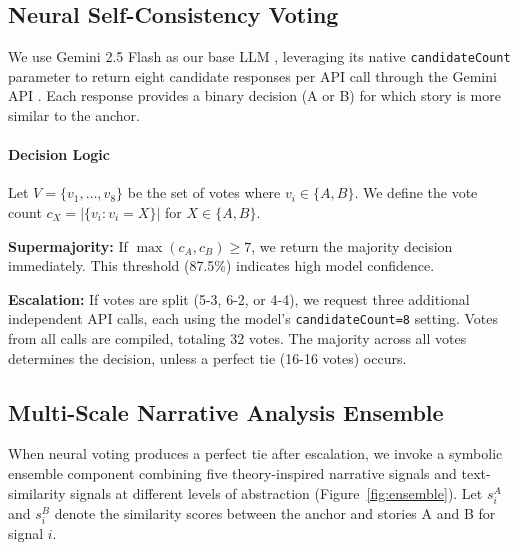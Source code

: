 \documentclass[11pt]{article}
\begin{document}
\subsection{Neural Self-Consistency Voting}

We use Gemini 2.5 Flash as our base LLM \citep{google-gemini-2-5-flash-2025}, leveraging its native \texttt{candidateCount} parameter to return eight candidate responses per API call through the Gemini API \citep{google-generative-ai-api-2025}. Each response provides a binary decision (A or B) for which story is more similar to the anchor.

\paragraph{Decision Logic}
Let $V = \{v_1, \ldots, v_8\}$ be the set of votes where $v_i \in \{A, B\}$. We define the vote count $c_X = |\{v_i : v_i = X\}|$ for $X \in \{A, B\}$.

\textbf{Supermajority:} If $\max(c_A, c_B) \geq 7$, we return the majority decision immediately. This threshold (87.5\%) indicates high model confidence.

\textbf{Escalation:} If votes are split (5-3, 6-2, or 4-4), we request three additional independent API calls, each using the model's \texttt{candidateCount=8} setting. Votes from all calls are compiled, totaling 32 votes. The majority across all votes determines the decision, unless a perfect tie (16-16 votes) occurs.

\subsection{Multi-Scale Narrative Analysis Ensemble}

When neural voting produces a perfect tie after escalation, we invoke a symbolic ensemble component combining five theory-inspired narrative signals and text-similarity signals at different levels of abstraction (Figure~\ref{fig:ensemble}). Let $s_i^A$ and $s_i^B$ denote the similarity scores between the anchor and stories A and B for signal $i$.
\end{document}
